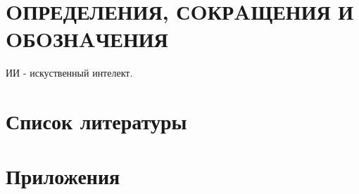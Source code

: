 \newpage
{}
\section{OПРЕДЕЛЕНИЯ, СOКРAЩЕНИЯ И OБOЗНAЧЕНИЯ}

ИИ - искуственный интелект.

\newpage
{}
\tableofcontents






\newpage
{}
\section{Список литературы}

\newpage

\section{Приложения}


